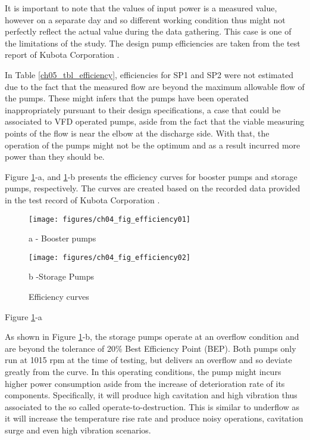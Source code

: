 It is important to note that the values of input power is a measured value, however on a separate day and so different working condition thus might not perfectly reflect 
the actual value during the data gathering. This case is one of the limitations of the study.
The design pump efficiencies are taken from the test report of Kubota Corporation \cite{Kubota2010}. 

In Table \ref{ch05_tbl_efficiency}, efficiencies for SP1 and SP2 were not estimated due to the fact that the measured flow are beyond the maximum allowable flow of the pumps. 
These might infers that the pumps have been operated inappropriately pursuant to their design specifications, 
a case that could be associated to VFD operated pumps, aside from the fact that the viable measuring points of the flow is near the elbow at the discharge side. 
With that, the operation of the pumps might not be the optimum and as a result incurred more power than they should be. 

Figure \ref{ch04_efficiencycurves}-a, and \ref{ch04_efficiencycurves}-b presents the efficiency curves for booster pumps and storage pumps, respectively. The curves are created based on the recorded data provided in the test record of Kubota Corporation \cite{Kubota2010}. 


\begin{figure}[!htb]
	\begin{minipage}[b]{0.5\linewidth}
		\centering
		\texttt{[image: figures/ch04\_fig\_efficiency01]}
		\caption*{a - Booster pumps}%
	\end{minipage}
	\hspace{0.05cm}
	\begin{minipage}[b]{0.5\linewidth}
		\centering
		\texttt{[image: figures/ch04\_fig\_efficiency02]}
		\caption*{b -Storage Pumps} %
	\end{minipage}
		\caption{Efficiency curves}
		\label{ch04_efficiencycurves}
\end{figure}

Figure \ref{ch04_efficiencycurves}-a 

As shown in Figure \ref{ch04_efficiencycurves}-b, the storage pumps operate at an overflow condition and are beyond the tolerance of 20\% Best Efficiency Point (BEP). Both pumps only run at 1015 rpm at the time of testing, but delivers an overflow and so deviate greatly from the curve. In this operating conditions, the pump might incurs higher power consumption aside from the increase of deterioration rate of its components. Specifically, it will produce high cavitation and high vibration thus associated to the so called operate-to-destruction. This is similar to underflow as it will increase the temperature rise rate and produce noisy operations, cavitation surge and even high vibration scenarios.  

